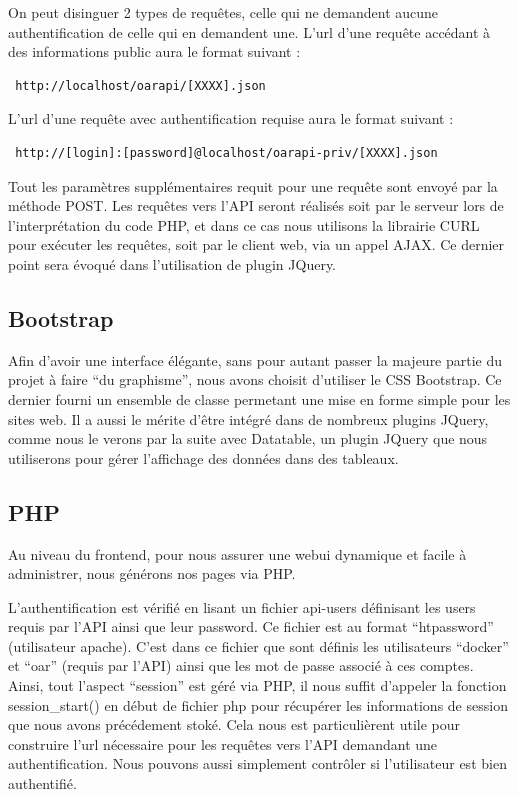 \documentclass[a4paper,10pt]{article}
\begin{document}
On peut disinguer 2 types de requêtes, celle qui ne demandent aucune authentification de celle qui en demandent une.
L'url d'une requête accédant à des informations public aura le format suivant :

\begin{verbatim}
 http://localhost/oarapi/[XXXX].json
\end{verbatim}

L'url d'une requête avec authentification requise aura le format suivant :

\begin{verbatim}
 http://[login]:[password]@localhost/oarapi-priv/[XXXX].json
\end{verbatim}

Tout les paramètres supplémentaires requit pour une requête sont envoyé par la méthode POST.
Les requêtes vers l'API seront réalisés soit par le serveur lors de l'interprétation du code PHP, et dans ce cas nous utilisons la librairie CURL pour exécuter les requêtes, soit par le client web, via un appel AJAX.
Ce dernier point sera évoqué dans l'utilisation de plugin JQuery.

\subsection{Bootstrap}
Afin d'avoir une interface élégante, sans pour autant passer la majeure partie du projet à faire ``du graphisme'', nous avons choisit d'utiliser le CSS Bootstrap. Ce dernier fourni un ensemble de classe permetant
une mise en forme simple pour les sites web. Il a aussi le mérite d'être intégré dans de nombreux plugins  JQuery, comme nous le verons par la suite avec Datatable, un plugin JQuery que nous utiliserons
pour gérer l'affichage des données dans des tableaux.

\subsection{PHP}
Au niveau du frontend, pour nous assurer une webui dynamique et facile à administrer, nous générons nos pages via PHP.

L'authentification est vérifié en lisant un fichier api-users définisant les users requis par l'API ainsi que leur password. Ce fichier est au format ``htpassword'' (utilisateur apache).
C'est dans ce fichier que sont définis les utilisateurs ``docker'' et ``oar'' (requis par l'API) ainsi que les mot de passe associé à ces comptes.
Ainsi, tout l'aspect ``session'' est géré via PHP, il nous suffit d'appeler la fonction session\_start() en début de fichier php pour récupérer les informations de session que nous avons précédement stoké.
Cela nous est particulièrent utile pour construire l'url nécessaire pour les requêtes vers l'API demandant une authentification. Nous pouvons aussi simplement contrôler si l'utilisateur est bien authentifié.
\vspace{0.5cm}
\end{document}

